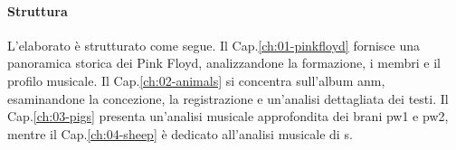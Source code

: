\documentclass[class=book, crop=false, oneside, 12pt]{standalone}
\begin{document}
\paragraph{Struttura}
L'elaborato è strutturato come segue. Il Cap.\ref{ch:01-pinkfloyd} fornisce una panoramica storica dei Pink Floyd, analizzandone la formazione, i membri e il profilo musicale. Il Cap.\ref{ch:02-animals} si concentra sull'album \acrlong{anm}, esaminandone la concezione, la registrazione e un'analisi dettagliata dei testi. Il Cap.\ref{ch:03-pigs} presenta un'analisi musicale approfondita dei brani \acrlong{pw1} e \acrlong{pw2}, mentre il Cap.\ref{ch:04-sheep} è dedicato all'analisi musicale di \acrlong{s}.
\end{document}

